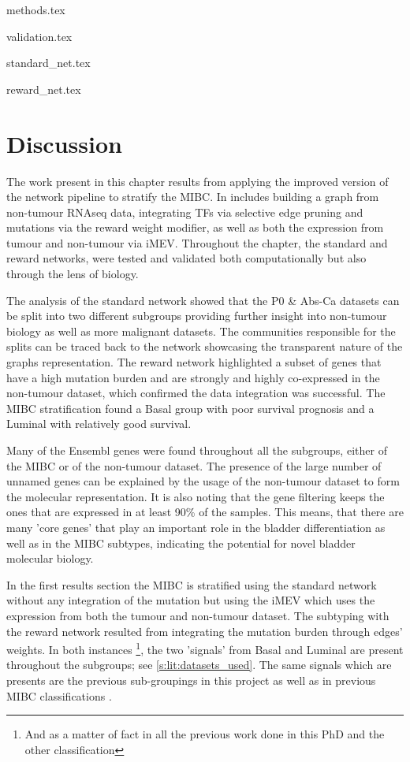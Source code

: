 {methods.tex}

{validation.tex}

{standard_net.tex}

{reward_net.tex}

\section{Discussion}

The work present in this chapter results from applying the improved version of the network pipeline to stratify the MIBC. In includes building a graph from non-tumour RNAseq data, integrating TFs via selective edge pruning and mutations via the reward weight modifier, as well as both the expression from tumour and non-tumour via iMEV. Throughout the chapter, the standard and reward networks, were tested and validated both computationally but also through the lens of biology. 

The analysis of the standard network showed that the P0 \& Abs-Ca datasets can be split into two different subgroups providing further insight into non-tumour biology as well as more malignant datasets. The communities responsible for the splits can be traced back to the network showcasing the transparent nature of the graphs representation. The reward network highlighted a subset of genes that have a high mutation burden and are strongly and highly co-expressed in the non-tumour dataset, which confirmed the data integration was successful. The MIBC stratification found a Basal group with poor survival prognosis and a Luminal with relatively good survival.

Many of the Ensembl genes were found throughout all the subgroups, either of the MIBC or of the non-tumour dataset. The presence of the large number of unnamed genes can be explained by the usage of the non-tumour dataset to form the molecular representation. It is also noting that the gene filtering keeps the ones that are expressed in at least 90\% of the samples. This means, that there are many 'core genes' that play an important role in the bladder differentiation as well as in the MIBC subtypes, indicating the potential for novel bladder molecular biology. 

In the first results section the MIBC is stratified using the standard network without any integration of the mutation but using the iMEV which uses the expression from both the tumour and non-tumour dataset. The subtyping with the reward network resulted from integrating the mutation burden through edges' weights. In both instances \footnote{And as a matter of fact in all the previous work done in this PhD and the other classification}, the two 'signals' from Basal and Luminal are present throughout the subgroups; see \cref{s:lit:datasets_used}. The same signals which are presents are the previous sub-groupings in this project as well as in previous MIBC classifications \citep{Robertson2017-mg, Kamoun2020-tj, Marzouka2018-ge}.

